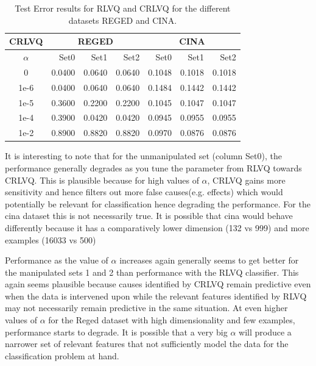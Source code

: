 \documentclass{esannV2}
\begin{document}
\begin{table}[!h]
	\centering
			\begin{footnotesize}
\begin{tabular}{|c|r|r|r|r|r|r|}
\hline
     CRLVQ &         \multicolumn{ 3}{|c|}{REGED} &          \multicolumn{ 3}{|c|}{CINA}  \\
\hline
$\alpha$ &     Set0 &       Set1 &       Set2 &       Set0 &       Set1 &       Set2 \\
\hline
  0    &     0.0400 &     0.0640 &     0.0640 &     0.1048 &     0.1018 &     0.1018 \\
\hline
  1e-6 &     0.0400 &     0.0640 &     0.0640 &     0.1484 &     0.1442 &     0.1442 \\
\hline
  1e-5 &     0.3600 &     0.2200 &     0.2200 &     0.1045 &     0.1047 &     0.1047  \\
\hline
  1e-4 &     0.3900 &     0.0420 &     0.0420 &     0.0945 &     0.0955 &     0.0955  \\
\hline
  1e-2 &     0.8900 &     0.8820 &     0.8820 &     0.0970 &     0.0876 &     0.0876  \\
\hline
\end{tabular}   
			\end{footnotesize}
	\caption{Test Error results for RLVQ and CRLVQ for the different datasets REGED and CINA.}
	\label{tab:TestErrorResults}
\end{table}

It is interesting to note that for the unmanipulated set (column Set0), the performance generally degrades as you tune the parameter from RLVQ towards CRLVQ. This is plausible because for high values of $\alpha$, CRLVQ gains more sensitivity and hence filters out more false causes(e.g. effects) which would potentially be relevant for classification hence degrading the performance. For the cina dataset this is not necessarily true. It is possible that cina would behave differently because it has a comparatively lower dimension (132 vs 999) and more examples (16033 vs 500)

Performance as the value of $\alpha$ increases again generally seems to get better for the manipulated sets 1 and 2 than performance with the RLVQ classifier. This again seems plausible because causes identified by CRLVQ remain predictive even when the data is intervened upon while the relevant features identified by RLVQ may not necessarily remain predictive in the same situation. At even higher values of $\alpha$ for the Reged dataset with high dimensionality and few examples, performance starts to degrade. It is possible that a very big $\alpha$ will produce a narrower set of relevant features that not sufficiently model the data for the classification problem at hand.
\end{document}
